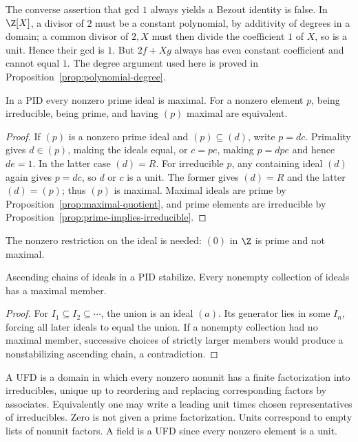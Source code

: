 The converse assertion that gcd $1$ always yields a Bezout identity is
false. In $\Z[X]$, a divisor of $2$ must be a constant polynomial,
by additivity of degrees in a domain; a common divisor of $2,X$ must
then divide the coefficient $1$ of $X$, so is a unit. Hence their gcd
is $1$. But $2f+Xg$ always has even constant coefficient and cannot
equal $1$. The degree argument used here is proved in
Proposition~\ref{prop:polynomial-degree}.

\begin{proposition}\label{prop:pid-primes}
In a PID every nonzero prime ideal is maximal. For a nonzero element
$p$, being irreducible, being prime, and having $(p)$ maximal are equivalent.
\end{proposition}
\begin{proof}
If $(p)$ is a nonzero prime ideal and $(p)\subseteq(d)$, write $p=dc$.
Primality gives $d\in(p)$, making the ideals equal, or $c=pe$, making
$p=dpe$ and hence $de=1$. In the latter case $(d)=R$.
For irreducible $p$, any containing ideal $(d)$ again gives $p=dc$,
so $d$ or $c$ is a unit. The former gives $(d)=R$ and the latter
$(d)=(p)$; thus $(p)$ is maximal.
Maximal ideals are prime by Proposition~\ref{prop:maximal-quotient},
and prime elements are irreducible by
Proposition~\ref{prop:prime-implies-irreducible}.
\end{proof}
The nonzero restriction on the ideal is needed: $(0)$ in $\Z$ is prime
and not maximal.

\begin{lemma}\label{lem:pid-acc}
Ascending chains of ideals in a PID stabilize. Every nonempty collection
of ideals has a maximal member.
\end{lemma}
\begin{proof}
For $I_1\subseteq I_2\subseteq\cdots$, the union is an ideal $(a)$.
Its generator lies in some $I_n$, forcing all later ideals to equal
the union. If a nonempty collection had no maximal member, successive
choices of strictly larger members would produce a nonstabilizing
ascending chain, a contradiction.
\end{proof}

A UFD is a domain in which every nonzero nonunit has a finite factorization
into irreducibles, unique up to reordering and replacing corresponding
factors by associates. Equivalently one may write a leading unit times
chosen representatives of irreducibles. Zero is not given a prime
factorization. Units correspond to empty lists of nonunit factors.
A field is a UFD since every nonzero element is a unit.

